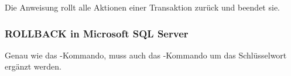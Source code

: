 \begin{merke}
    Die Anweisung \ROLLBACK{} rollt alle Aktionen einer Transaktion
    zurück und beendet sie.
\end{merke}
\subsubsection{ROLLBACK in Microsoft SQL Server}
Genau wie das \COMMIT-Kommando, muss auch das \ROLLBACK-Kommando um
das Schlüsselwort  ergänzt werden.
